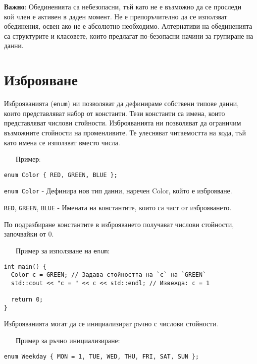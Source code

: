 \documentclass[oneside]{book}
\newcommand*{\code}[1]{\texttt{#1}}
\begin{document}
\textbf{Важно}: Обединенията са небезопасни, тъй като не е възможно да се проследи кой член е активен в даден момент.
Не е препоръчително да се използват обединения, освен ако не е абсолютно необходимо.
Алтернативи на обединенията са структурите и класовете, които предлагат по-безопасни начини за групиране на данни.

\section{Изброяване}
Изброяванията (\code{enum}) ни позволяват да дефинираме собствени типове данни, които представляват набор от константи. Тези константи са имена, които представляват числови стойности.
Изброяванията ни позволяват да ограничим възможните стойности на променливите.
Те улесняват читаемостта на кода, тъй като имена се използват вместо числа.
\pagebreak
\begin{itemize}\item[Пример:]\end{itemize}
\begin{mdframed}\begin{lstlisting}
enum Color { RED, GREEN, BLUE };
\end{lstlisting}\end{mdframed}

\code{enum Color} - Дефинира нов тип данни, наречен Color, който е изброяване.

\code{RED}, \code{GREEN}, \code{BLUE} - Имената на константите, които са част от изброяването.

По подразбиране константите в изброяването получават числови стойности, започвайки от 0.

\begin{itemize}\item[Пример] за използване на \code{enum}:\end{itemize}
\begin{mdframed}\begin{lstlisting}
int main() {
  Color c = GREEN; // Задава стойността на `c` на `GREEN`
  std::cout << "c = " << c << std::endl; // Извежда: c = 1

  return 0;
}
\end{lstlisting}\end{mdframed}

Изброяванията могат да се инициализират ръчно с числови стойности.

\begin{itemize}\item[Пример] за ръчно инициализиране:\end{itemize}
\begin{mdframed}\begin{lstlisting}
enum Weekday { MON = 1, TUE, WED, THU, FRI, SAT, SUN };
\end{lstlisting}\end{mdframed}
\end{document}
